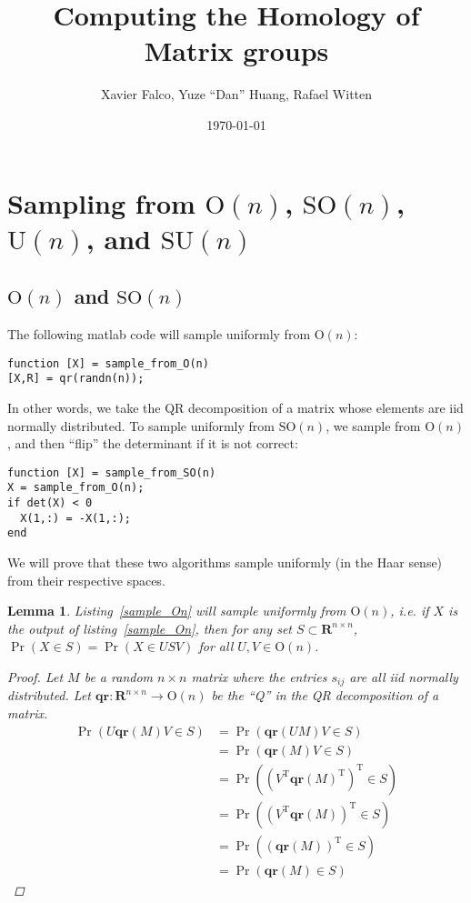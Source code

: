 \documentclass[letterpaper,11pt]{article}
\title{Computing the Homology of Matrix groups}
\author{Xavier Falco, Yuze ``Dan'' Huang, Rafael Witten}
\date{\today}
\newtheorem{lemma}{Lemma}
\newcommand{\Tr}{^\text{T}}
\newcommand{\reals}{\mathbf{R}}
\newcommand{\MG}[2]{{\text{#1}(#2)}}
\newcommand{\Un}{\MG{U}{n}}
\newcommand{\On}{\MG{O}{n}}
\newcommand{\SUn}{\MG{SU}{n}}
\newcommand{\SOn}{\MG{SO}{n}}
\newcommand{\qr}{\mathbf{qr}}
\begin{document}
\maketitle
\thispagestyle{empty}
\section{Sampling from $\On$, $\SOn$, $\Un$, and $\SUn$}

\subsection{$\On$ and $\SOn$}
The following matlab code will sample uniformly from $\On$:

\begin{lstlisting}[label=sample_On,caption=Sampling from $\On$]
function [X] = sample_from_O(n)
[X,R] = qr(randn(n));
\end{lstlisting}

In other words, we take the QR decomposition of a matrix whose elements are iid
  normally distributed.
To sample uniformly from $\SOn$, we sample from $\On$, and then
  ``flip'' the determinant if it is not correct:

\begin{lstlisting}[label=sample_SOn,caption=Sampling from $\SOn$]
function [X] = sample_from_SO(n)
X = sample_from_O(n);
if det(X) < 0
  X(1,:) = -X(1,:);
end
\end{lstlisting}

We will prove that these two algorithms sample uniformly (in the Haar sense)
  from their respective spaces.

\begin{lemma}
Listing~\ref{sample_On} will sample uniformly from $\On$, i.e. if $X$
  is the output of listing~\ref{sample_On}, then for any set $S\subset
  \reals^{n\times n}$, $\Pr(X\in S) = \Pr(X\in USV)$ for all $U,V \in \On$.

\begin{proof}
Let $M$ be a random $n\times n$ matrix where the entries $s_{ij}$ are all iid
  normally distributed.
Let $\qr:\reals^{n\times n} \to \On$ be the ``Q'' in the QR decomposition
  of a matrix.
\begin{align}
\Pr\left(U\qr(M)V\in S\right) &= \Pr\left(\qr(UM)V \in S\right)\\
  &= \Pr\left(\qr(M)V \in S             \right)\\
  &= \Pr\left( (V\Tr\qr(M)\Tr)\Tr \in S \right)\\
  &= \Pr\left( (V\Tr\qr(M))\Tr \in S    \right)\\
  &= \Pr\left((\qr(M))\Tr \in S         \right)\\
  &= \Pr\left(\qr(M) \in S              \right)
\end{align}
\end{proof}
\end{lemma}
\end{document}
